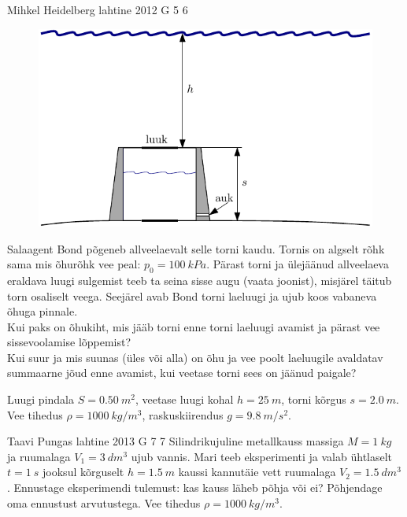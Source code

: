 \documentclass[11pt, twoside]{article}
\begin{document}
{%
{Mihkel Heidelberg} %
{lahtine} %
{2012} %
{G 5} %
{6} %
{
\ifStatement
\begin{figure}%
\includegraphics[width=\linewidth]{2012-lahg-05-allveelaev_g}%
\end{figure}
Salaagent Bond põgeneb allveelaevalt selle torni kaudu. Tornis on algselt
rõhk sama mis õhurõhk vee peal: $p_0 = \SI{100}{kPa}$. Pärast torni ja ülejäänud
allveelaeva eraldava luugi sulgemist teeb ta seina sisse augu (vaata joonist), misjärel
täitub torn osaliselt veega. Seejärel avab Bond torni laeluugi ja ujub
koos vabaneva õhuga pinnale.\\
\osa Kui paks on õhukiht, mis jääb torni enne torni
laeluugi avamist ja pärast vee sissevoolamise lõppemist?\\
\osa Kui suur ja mis suunas (üles või alla) on õhu ja vee poolt laeluugile avaldatav summaarne jõud enne
avamist, kui veetase torni sees on jäänud paigale?
\par
Luugi pindala $S =
\SI{0,50}{m^2}$, veetase luugi kohal $h=\SI{25}{m}$, torni kõrgus 
$s=\SI{2,0}{m}$. Vee tihedus $\rho = \SI{1000}{kg/m^3}$, raskuskiirendus $g =
\SI{9,8}{m/s^2}$.
\fi
}

{Taavi Pungas} %
{lahtine} %
{2013} %
{G 7} %
{7} %
{
\ifStatement
Silindrikujuline metallkauss massiga $M=\SI{1}{kg}$ ja ruumalaga
$V_1=\SI{3}{dm^3}$ ujub vannis. Mari teeb eksperimenti ja valab ühtlaselt
$t=\SI{1}{s}$ jooksul kõrguselt $h=\SI{1,5}{m}$ kaussi kannutäie vett ruumalaga
$V_2=\SI{1,5}{dm^3}$. Ennustage eksperimendi tulemust: kas kauss läheb põhja või
ei? Põhjendage oma ennustust arvutustega. Vee tihedus $\rho=\SI{1000}{kg/m^3}$.
\fi
}

}
\end{document}
